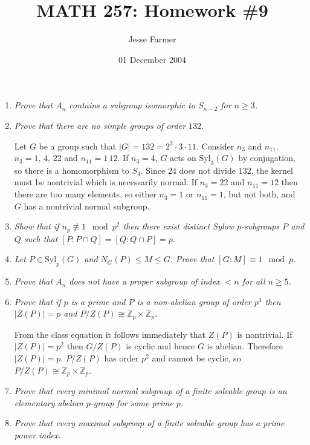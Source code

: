 \documentclass[letterpaper, 11pt]{article}
\title{MATH 257: Homework \#9}
\author{Jesse Farmer}
\date{01 December 2004}
\newcommand{\Syl}{\text{Syl}}
\newcommand{\Z}{\mathbb{Z}}
\begin{document}
\maketitle
\begin{enumerate}

\item \emph{Prove that $A_n$ contains a subgroup isomorphic to $S_{n-2}$ for $n \geq 3$.}

\item \emph{Prove that there are no simple groups of order $132$.}

Let $G$ be a group such that $|G| = 132 = 2^2 \cdot 3 \cdot 11$.  Consider $n_3$ and $n_11$.  $n_3 = 1,\,4,\,22$ and $n_{11}=1\,12$.  If $n_3 = 4$, $G$ acts on $\Syl_3(G)$ by conjugation, so there is a homomorphism to $S_4$.  Since $24$ does not divide $132$, the kernel must be nontrivial which is necessarily normal.  If $n_3 = 22$ and $n_{11} = 12$ then there are too many elements, so either $n_3 = 1$ or $n_{11} = 1$, but not both, and $G$ has a nontrivial normal subgroup.

\item \emph{Show that if $n_p \not\equiv 1 \mod p^2$ then there exist distinct Sylow $p$-subgroups $P$ and $Q$ such that $[P: P \cap Q] = [Q : Q \cap P] = p$.}

\item \emph{Let $P \in \Syl_p(G)$ and $N_G(P) \leq M \leq G$.  Prove that $[G:M] \equiv 1 \mod p$.}

\item \emph{Prove that $A_n$ does not have a proper subgroup of index $< n$ for all $n \geq 5$.}

\item \emph{Prove that if $p$ is a prime and $P$ is a non-abelian group of order $p^3$ then $|Z(P)| = p$ and $P/Z(P) \cong \Z_p \times \Z_p$.}

From the class equation it follows immediately that $Z(P)$ is nontrivial.  If $|Z(P)| = p^2$ then $G/Z(P)$ is cyclic and hence $G$ is abelian.  Therefore $|Z(P)| = p$.  $P/Z(P)$ has order $p^2$ and cannot be cyclic, so $P/Z(P) \cong \Z_p \times \Z_p$.

\item \emph{Prove that every minimal normal subgroup of a finite solvable group is an elementary abelian $p$-group for some prime $p$.}

\item \emph{Prove that every maximal subgroup of a finite solvable group has a prime power index.}

\end{enumerate}
\end{document}
